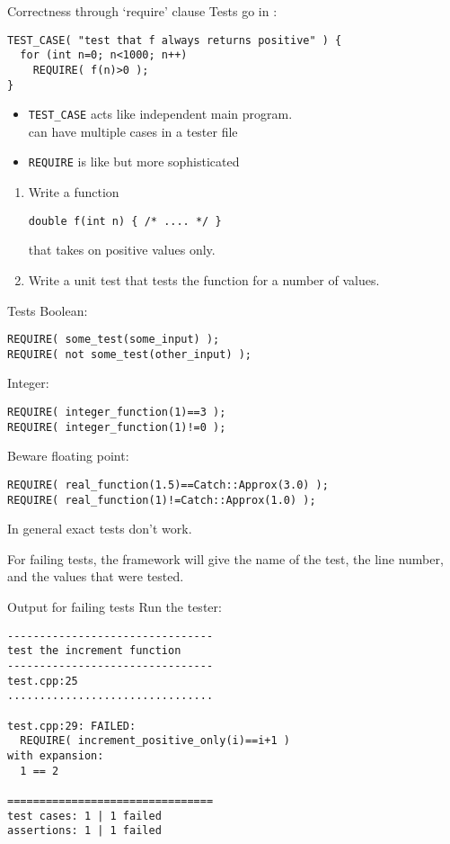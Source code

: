 \begin{block}{Correctness through `require' clause}
  \label{sl:catch-case-require}
Tests go in :
\begin{lstlisting}
TEST_CASE( "test that f always returns positive" ) {
  for (int n=0; n<1000; n++)
    REQUIRE( f(n)>0 );  
}
\end{lstlisting}
\begin{itemize}
  \item
    \lstinline+TEST_CASE+ acts like independent main program.\\
    can have multiple cases in a tester file
    \item \lstinline{REQUIRE} is like  but more sophisticated
  \end{itemize}
\end{block}

\begin{exercise}
  \label{ex:catch-example}
  \begin{enumerate}
  \item Write a function
\begin{lstlisting}
double f(int n) { /* .... */ }
\end{lstlisting}
    that takes on positive values only.
  \item Write a unit test that tests the function for a number of values.
  \end{enumerate}
\end{exercise}

\begin{block}{Tests}
  \label{sl:catch-approx}
  Boolean:
\begin{lstlisting}
REQUIRE( some_test(some_input) );
REQUIRE( not some_test(other_input) );
\end{lstlisting}
Integer:
\begin{lstlisting}
REQUIRE( integer_function(1)==3 );
REQUIRE( integer_function(1)!=0 );
\end{lstlisting}
Beware floating point:
\begin{lstlisting}
REQUIRE( real_function(1.5)==Catch::Approx(3.0) );
REQUIRE( real_function(1)!=Catch::Approx(1.0) );
\end{lstlisting}
In general exact tests don't work.
\end{block}

For failing tests, the framework will give
the name of the test, the line number,
and the values that were tested.

\begin{block}{Output for failing tests}
  \label{sl:catch-fail}
  \small
  Run the tester:
\begin{verbatim}
--------------------------------
test the increment function
--------------------------------
test.cpp:25
................................

test.cpp:29: FAILED:
  REQUIRE( increment_positive_only(i)==i+1 )
with expansion:
  1 == 2

================================
test cases: 1 | 1 failed
assertions: 1 | 1 failed
\end{verbatim}
\end{block}

